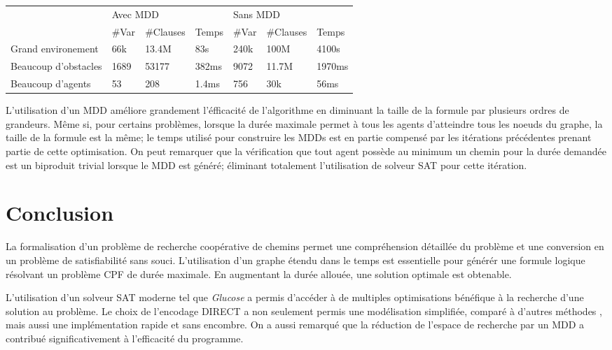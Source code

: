 \documentclass[french, 12pt, letterpaper]{article}
\theoremstyle{definition}
\theoremstyle{proposition}
\theoremstyle{example}
\begin{document}
    \begin{center}
        \begin{tabular}{l|lll|lll|}
            \cline{2-7}
                & \multicolumn{3}{l|}{Avec MDD} & \multicolumn{3}{l|}{Sans MDD} \\ \cline{2-7} 
                & \multicolumn{1}{l|}{\#Var} & \multicolumn{1}{l|}{\#Clauses} & Temps & \multicolumn{1}{l|}{\#Var} & \multicolumn{1}{l|}{\#Clauses} & Temps \\ \hline
            \multicolumn{1}{|l|}{Grand environement} & 66k & 13.4M & 83s & 240k & 100M & 4100s \\ \hline
            \multicolumn{1}{|l|}{Beaucoup d'obstacles} & 1689 & 53177 & 382ms & 9072 & 11.7M & 1970ms \\ \hline
            \multicolumn{1}{|l|}{Beaucoup d'agents} & 53 & 208 & 1.4ms & 756 & 30k & 56ms \\ \hline
        \end{tabular}
    \end{center}
    
    L'utilisation d'un MDD améliore grandement l'éfficacité de l'algorithme en diminuant la taille de la formule par plusieurs
    ordres de grandeurs. Même si, pour certains problèmes, lorsque la durée maximale permet à tous les agents d'atteindre tous les noeuds
    du graphe, la taille de la formule est la même; le temps utilisé pour construire les MDDs est en partie compensé par les itérations précédentes
    prenant partie de cette optimisation. On peut remarquer que la vérification que tout agent possède au minimum un chemin pour 
    la durée demandée est un biproduit trivial lorsque le MDD est généré; éliminant totalement l'utilisation de solveur SAT pour cette itération. 

    \newpage
    \section*{Conclusion}

    La formalisation d'un problème de recherche coopérative de chemins permet une compréhension détaillée du problème
    et une conversion en un problème de satisfiabilité sans souci. L'utilisation d'un graphe étendu dans
    le temps est essentielle pour générér une formule logique résolvant un problème CPF de durée maximale. 
    En augmentant la durée allouée, une solution optimale est obtenable.

    L'utilisation d'un solveur SAT moderne tel que \emph{Glucose} a permis d'accéder à de multiples optimisations bénéfique
    à la recherche d'une solution au problème. Le choix de l'encodage DIRECT a non seulement permis une modélisation simplifiée, comparé à d'autres
    méthodes \cite{PSUR16}, mais aussi une implémentation rapide et sans encombre. On a aussi remarqué que la réduction de l'espace
    de recherche par un MDD a contribué significativement à l'efficacité du programme.
\end{document}

